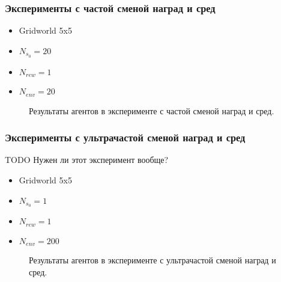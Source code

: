 \documentclass[a4paper]{article}
\begin{document}
\subsubsection{Эксперименты с частой сменой наград и сред}

\begin{itemize}
  \item Gridworld 5x5
  \item $N_{s_0} = 20$
  \item $N_{rew} = 1$
  \item $N_{env} = 20$
\end{itemize}

\begin{figure}
  \centering
  \begin{minipage}{.32\linewidth}
    
  \end{minipage}
  \begin{minipage}{.32\linewidth}
    
  \end{minipage}
  \begin{minipage}{.32\linewidth}
    
  \end{minipage}
  \caption{Результаты агентов в эксперименте с частой сменой наград и сред.}
\end{figure}

\subsubsection{Эксперименты с ультрачастой сменой наград и сред}

TODO Нужен ли этот эксперимент вообще?

\begin{itemize}
  \item Gridworld 5x5
  \item $N_{s_0} = 1$
  \item $N_{rew} = 1$
  \item $N_{env} = 200$
\end{itemize}

\begin{figure}
  \centering
  \begin{minipage}{.49\linewidth}
    
  \end{minipage}
  \begin{minipage}{.49\linewidth}
    
  \end{minipage}
  \caption{Результаты агентов в эксперименте с ультрачастой сменой наград и сред.}
\end{figure}
\end{document}
